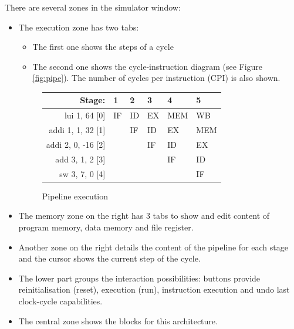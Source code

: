 \documentclass[10pt,a4paper]{article}
\theoremstyle{definition}%
\begin{document}
There are several zones in the simulator window:
\begin{itemize}
\item The execution zone has two tabs:
\begin{itemize}
\item The first one shows the steps of a cycle
\item The second one shows the cycle-instruction diagram (see Figure \vref{fig:pipe}). The number of cycles per instruction (CPI) is also shown.
\end{itemize}
\begin{figure}[h!]
	\begin{center}
		\begin{tabular}{r *{5}{C{1cm}}}
\toprule
  	Stage:			& 1	& 2 & 3 & 4 & 5 \\ 
 \midrule
\color{blue}lui 1, 64 \color{red}[0] 	& IF& ID & EX &  MEM & WB \\ 
\color{blue}addi 1, 1, 32 \color{red}[1] 	&  	& IF & ID &  EX & MEM \\ 
\color{blue}addi 2, 0, -16 \color{red}[2] &   &   & IF & ID &  EX \\ 
\color{blue}add 3, 1, 2 \color{red}[3] 	&  	&   &   & IF & ID \\ 
\color{blue}sw 3, 7, 0 \color{red}[4] 	&   &   &   &   & IF \\ 
\bottomrule
\end{tabular}
	\end{center}
\caption{Pipeline execution}
\label{fig:pipe}
\end{figure}

\item The memory zone on the right has 3 tabs to show and edit content of program memory, data memory and file register.
\item Another zone on the right details the content of the pipeline for each stage and the cursor shows the current step of the cycle.
\item The lower part groups the interaction possibilities: buttons provide reinitialisation (reset), execution (run), instruction execution and undo last clock-cycle capabilities. 
\item The central zone shows the blocks for this architecture.
\end{itemize}
\end{document}
